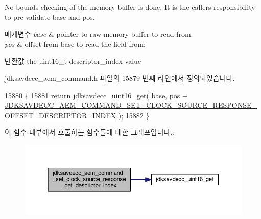 No bounds checking of the memory buffer is done. It is the caller\textquotesingle{}s responsibility to pre-\/validate base and pos.


\begin{DoxyParams}{매개변수}
{\em base} & pointer to raw memory buffer to read from. \\
\hline
{\em pos} & offset from base to read the field from; \\
\hline
\end{DoxyParams}
\begin{DoxyReturn}{반환값}
the uint16\+\_\+t descriptor\+\_\+index value 
\end{DoxyReturn}


jdksavdecc\+\_\+aem\+\_\+command.\+h 파일의 15879 번째 라인에서 정의되었습니다.


\begin{DoxyCode}
15880 \{
15881     \textcolor{keywordflow}{return} \hyperlink{group__endian_ga3fbbbc20be954aa61e039872965b0dc9}{jdksavdecc\_uint16\_get}( base, pos + 
      \hyperlink{group__command__set__clock__source__response_gaff08f8039a591f164c603d8e8666e6c9}{JDKSAVDECC\_AEM\_COMMAND\_SET\_CLOCK\_SOURCE\_RESPONSE\_OFFSET\_DESCRIPTOR\_INDEX}
       );
15882 \}
\end{DoxyCode}


이 함수 내부에서 호출하는 함수들에 대한 그래프입니다.\+:
\nopagebreak
\begin{figure}[H]
\begin{center}
\leavevmode
\includegraphics[width=350pt]{group__command__set__clock__source__response_gafece94c6286479a3c806d3997c73f3d5_cgraph}
\end{center}
\end{figure}





